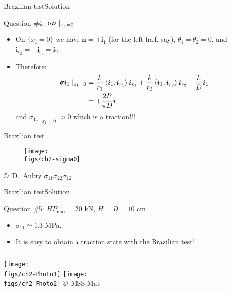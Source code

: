 \documentclass{beamer}
\newcommand{\xj}{x}
\renewcommand{\ij}{i}
\newcommand{\iv}{{\boldsymbol\ij}}
\newcommand{\nj}{n}
\newcommand{\nv}{{\boldsymbol\nj}}
\newcommand*{\stressj}{\sigma}
\newcommand*{\stress}{\mbox{$\hspace{0.3em}\rotatebox[x=0pt,y=0.2pt]{90}{\rule{0.017\linewidth}{0.4pt}}\hspace{-0.25em}\upsigma$}}
\newcommand{\scal}[1]{\left\langle{#1}\right\rangle}
\begin{document}
\begin{frame}{Brazilian test}{Solution}

\begin{exampleblock}{Question \#4: $\stress\nv\mid_{\xj_1=0}$}
\begin{itemize}
\item On $\{\xj_1=0\}$ we have $\nv=+\iv_1$ (for the left half, say), $\theta_1=\theta_2=0$, and $\iv_{r_2}=-\iv_{r_1}=\iv_2$.
\item Therefore:
\begin{displaymath}
\begin{split}
\stress\iv_1\mid_{\xj_1=0} &= \frac{k}{r_1}\scal{\iv_1,\iv_{r_1}}\iv_{r_1}+\frac{k}{r_2}\scal{\iv_1,\iv_{r_2}}\iv_{r_2}-\frac{k}{D}\iv_1 \\
&=+\frac{2P}{\pi D}\iv_1
\end{split}
\end{displaymath}
and $\stressj_{11}\mid_{\xj_1=0}>0$ which is a traction!!!
\end{itemize}
\end{exampleblock}

\end{frame}

\begin{frame}{Brazilian test}

\begin{figure}
\centering\texttt{[image: \\figs/ch2-sigma0]}
\end{figure}
\vskip-20pt
\hfill\mbox{\tiny{\copyright\ D. Aubry}}
\hspace*{1.5truecm}$\stressj_{11}$\hspace*{3truecm}$\stressj_{22}$\hspace*{3truecm}$\stressj_{12}$
\end{frame}

\begin{frame}{Brazilian test}{Solution}

\begin{exampleblock}{Question \#5: $HP_\text{max}=20$ kN, $H=D=10$ cm}
\begin{itemize}
\item $\stressj_{11}\simeq1.3$ MPa. 
\item It is easy to obtain a traction state with the Brazilian test!
\end{itemize}
\begin{columns}[t]
\centering\texttt{[image: \\figs/ch2-Photo1]}
\centering\texttt{[image: \\figs/ch2-Photo2]}
\vskip-5pt{\hspace*{3truecm}\mbox{\tiny{\copyright\ MSS-Mat}}}
\end{columns}
\end{exampleblock}

\end{frame}
\end{document}
